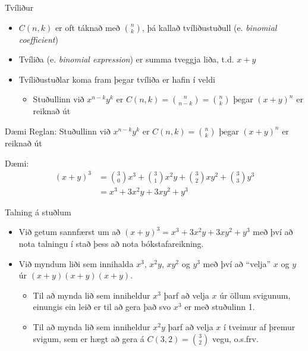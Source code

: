 \documentclass{beamer}
\begin{document}
\begin{frame}{Tvíliður}
\begin{itemize}
 \item $C(n,k)$ er oft táknað með $\binom{n}{k}$, þá kallað tvíliðustuðull (e. \emph{binomial coefficient})
 \item Tvíliða (e. \emph{binomial expression}) er summa tveggja liða, t.d. $x + y$
 \item Tvíliðustuðlar koma fram þegar tvíliða er hafin í veldi
 \begin{itemize}
  \item Stuðullinn við $x^{n-k}y^{k}$ er $C(n,k) = \binom{n}{n-k} = \binom{n}{k}$ þegar $(x + y)^n$ er reiknað út
 \end{itemize}
\end{itemize}
\end{frame}

\begin{frame}{Dæmi}
Reglan: Stuðullinn við $x^{n-k}y^{k}$ er $C(n,k) = \binom{n}{k}$ þegar $(x + y)^n$ er reiknað út

Dæmi:
\begin{align*}
(x+y)^3 &= \binom{3}{0} x^3 + \binom{3}{1}x^2y + \binom{3}{2}xy^2 + \binom{3}{3}y^3\\
&= x^3 + 3x^2y + 3xy^2 + y^3
\end{align*}

\end{frame}

\begin{frame}{Talning á stuðlum}
\begin{itemize}
 \item Við getum sannfærst um að $(x+y)^3 = x^3 + 3x^2y + 3xy^2 + y^3$ með því að nota talningu í stað þess að nota bókstafareikning.
 \item Við myndum liði sem innihalda $x^3$, $x^2y$, $xy^2$ og $y^3$ með því að ``velja'' $x$ og $y$ úr $(x+y)(x+y)(x+y)$.
 \begin{itemize}
  \item Til að mynda lið sem inniheldur $x^3$ þarf að velja $x$ úr öllum svigunum, einungis ein leið er til að gera það svo $x^3$ er með stuðulinn 1. 
  \item Til að mynda lið sem inniheldur $x^2y$ þarf að velja $x$ í tveimur af þremur svigum, sem er hægt að gera á $C(3,2) = \binom{3}{2}$ vegu, o.s.frv.
 \end{itemize}
\end{itemize}
\end{frame}
\end{document}
